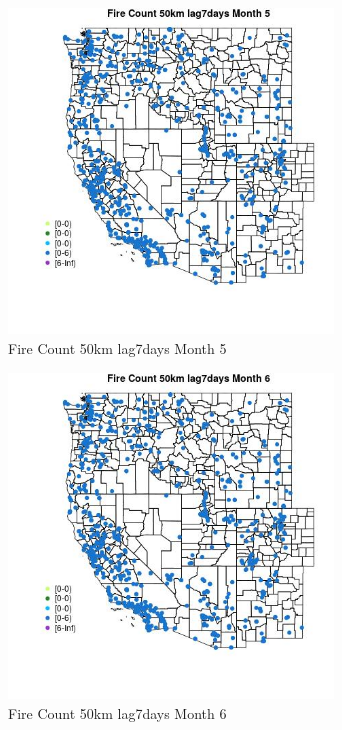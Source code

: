 \begin{figure} 
\centering  
\includegraphics[width=0.77\textwidth]{Code_Outputs/Report_ML_input_PM25_Step4_part_e_de_duplicated_aves_compiled_2019-05-21wNAs_MapObsMo5Fire_Count_50km_lag7days.jpg} 
\caption{\label{fig:Report_ML_input_PM25_Step4_part_e_de_duplicated_aves_compiled_2019-05-21wNAsMapObsMo5Fire_Count_50km_lag7days}Fire Count 50km lag7days Month 5} 
\end{figure} 
 

\begin{figure} 
\centering  
\includegraphics[width=0.77\textwidth]{Code_Outputs/Report_ML_input_PM25_Step4_part_e_de_duplicated_aves_compiled_2019-05-21wNAs_MapObsMo6Fire_Count_50km_lag7days.jpg} 
\caption{\label{fig:Report_ML_input_PM25_Step4_part_e_de_duplicated_aves_compiled_2019-05-21wNAsMapObsMo6Fire_Count_50km_lag7days}Fire Count 50km lag7days Month 6} 
\end{figure} 
 

